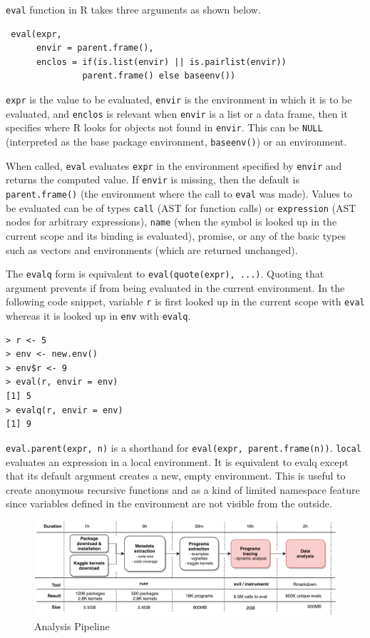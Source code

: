 \documentclass[a4paper,USenglish,cleveref, autoref, thm-restate]{lipics-v2019}
\newcommand{\eval}{\texttt{eval}\xspace}
\renewcommand{\c}[1]{\lstinline{#1}\xspace}
\begin{document}
\eval function in R takes three arguments as shown below.
\begin{lstlisting}
 eval(expr,
      envir = parent.frame(),
      enclos = if(is.list(envir) || is.pairlist(envir))
               parent.frame() else baseenv())
\end{lstlisting}           

\c{expr} is the value to be evaluated, \c{envir}
is the environment in which it is to be evaluated, and \c{enclos} is
relevant when \c{envir} is a list or a data frame, then it specifies where R
looks for objects not found in \c{envir}. This can be \c{NULL} (interpreted
as the base package environment, \c{baseenv()}) or an environment.

When called, \eval evaluates \c{expr} in the environment specified by
\c{envir} and returns the computed value. If \c{envir} is missing, then the
default is \c{parent.frame()} (the environment where the call to \eval was
made).  Values to be evaluated can be of types \c{call} (AST for function
calls) or \c{expression} (AST nodes for arbitrary expressions), \c{name}
(when the symbol is looked up in the current scope and its binding is
evaluated), promise, or any of the basic types such as vectors and
environments (which are returned unchanged).

The \c{evalq} form is equivalent to \c{eval(quote(expr), ...)}.  Quoting
that argument prevents if from being evaluated in the current environment.
In the following code snippet, variable \c{r} is first looked up in
the current scope with \eval whereas it is looked up in \c{env} with
\c{evalq}.

\begin{lstlisting}
> r <- 5
> env <- new.env()
> env$r <- 9
> eval(r, envir = env)
[1] 5
> evalq(r, envir = env)
[1] 9
\end{lstlisting}

\c{eval.parent(expr, n)} is a shorthand for \c{eval(expr, parent.frame(n))}.
\c{local} evaluates an expression in a local environment. It is equivalent
to evalq except that its default argument creates a new, empty
environment. This is useful to create anonymous recursive functions and as a
kind of limited namespace feature since variables defined in the environment
are not visible from the outside.

\begin{figure}[!t]\centering\includegraphics[width=.8\linewidth]
{pipeline.pdf}\caption{Analysis Pipeline}\label{fig:pipeline}
\end{figure}
\end{document}
